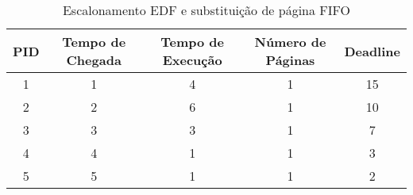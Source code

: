 \documentclass{article}
\begin{document}
%
\begin{table}[!htbp]
\centering
\caption{Escalonamento EDF e substituição de página FIFO}
\label{undefined}
\begin{tabular}{|c|c|c|c|c|}
\hline
PID & Tempo de Chegada & Tempo de Execução & Número de Páginas & Deadline \\ \hline
   1&    1&    4&    1& 15\\ \hline
   2&    2&   6&    1& 10\\ \hline
   3&    3&   3&    1& 7	\\ \hline
   4&    4&   1&    1& 3\\ \hline
   5&    5&   1&    1& 2	\\ \hline
\end{tabular}
\end{table}
	
\end{document}
